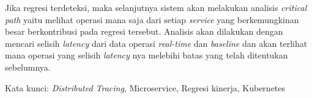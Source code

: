 Jika regresi terdeteksi, maka selanjutnya sistem akan melakukan analisis \textit{critical path} yaitu melihat operasi mana saja dari setiap \textit{service} yang berkemungkinan besar berkontribusi pada regresi tersebut. Analisis akan dilakukan dengan mencari selisih \textit{latency} dari data operasi \textit{real-time} dan \textit{baseline} dan akan terlihat mana operasi yang selisih \textit{latency} nya melebihi batas yang telah ditentukan sebelumnya.



%
%





\vspace{15mm}
Kata kunci: \textit{Distributed Tracing}, Microservice, Regresi kinerja, Kubernetes
\clearpage